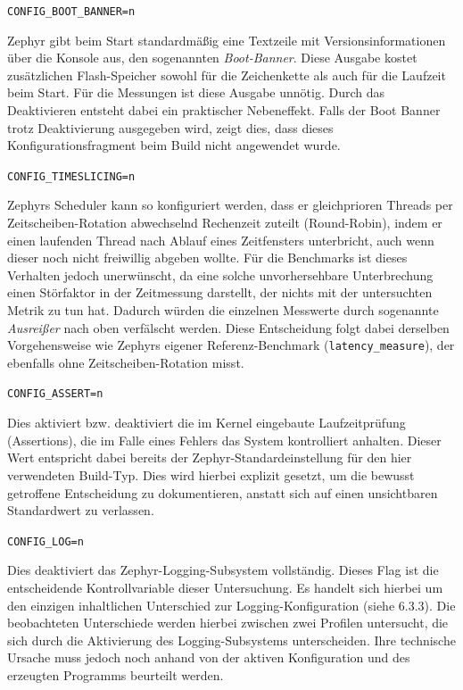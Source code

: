 \lstinline[style=fileinline]|CONFIG_BOOT_BANNER=n|

Zephyr gibt beim Start standardmäßig eine Textzeile mit Versionsinformationen über die Konsole aus, den sogenannten \emph{Boot-Banner}. Diese Ausgabe kostet zusätzlichen Flash-Speicher sowohl für die Zeichenkette als auch für die Laufzeit beim Start. Für die Messungen ist diese Ausgabe unnötig. Durch das Deaktivieren entsteht dabei ein praktischer Nebeneffekt. Falls der Boot Banner trotz Deaktivierung ausgegeben wird, zeigt dies, dass dieses Konfigurationsfragment beim Build nicht angewendet wurde.

\lstinline[style=fileinline]|CONFIG_TIMESLICING=n|

Zephyrs Scheduler kann so konfiguriert werden, dass er gleichprioren Threads per Zeitscheiben-Rotation abwechselnd Rechenzeit zuteilt (Round-Robin), indem er einen laufenden Thread nach Ablauf eines Zeitfensters unterbricht, auch wenn dieser noch nicht freiwillig abgeben wollte. Für die Benchmarks ist dieses Verhalten jedoch unerwünscht, da eine solche unvorhersehbare Unterbrechung einen Störfaktor in der Zeitmessung darstellt, der nichts mit der untersuchten Metrik zu tun hat. Dadurch würden die einzelnen Messwerte durch sogenannte\emph{ Ausreißer} nach oben verfälscht werden. Diese Entscheidung folgt dabei derselben Vorgehensweise wie Zephyrs eigener Referenz-Benchmark (\lstinline[style=fileinline]|latency_measure|), der ebenfalls ohne Zeitscheiben-Rotation misst.

\lstinline[style=fileinline]|CONFIG_ASSERT=n|

Dies aktiviert bzw. deaktiviert die im Kernel eingebaute Laufzeitprüfung (Assertions), die im Falle eines Fehlers das System kontrolliert anhalten. Dieser Wert entspricht dabei bereits der Zephyr-Standardeinstellung für den hier verwendeten Build-Typ. Dies wird hierbei explizit gesetzt, um die bewusst getroffene Entscheidung zu dokumentieren, anstatt sich auf einen unsichtbaren Standardwert zu verlassen.

\lstinline[style=fileinline]|CONFIG_LOG=n|

Dies deaktiviert das Zephyr-Logging-Subsystem vollständig. Dieses Flag ist die entscheidende Kontrollvariable dieser Untersuchung. Es handelt sich hierbei um den einzigen inhaltlichen Unterschied zur Logging-Konfiguration (siehe 6.3.3). Die beobachteten Unterschiede werden hierbei zwischen zwei Profilen untersucht, die sich durch die Aktivierung des Logging-Subsystems unterscheiden. Ihre technische Ursache muss jedoch noch anhand von der aktiven Konfiguration und des erzeugten Programms beurteilt werden.

